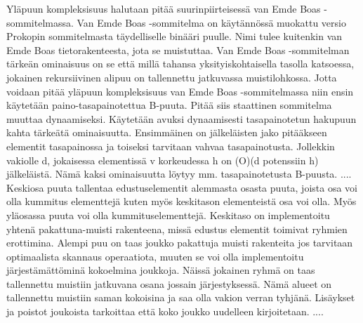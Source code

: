\documentclass[finnish]{tktltiki2}
\theoremstyle{definition}
\theoremstyle{remark}
\begin{document}
            Yläpuun kompleksisuus halutaan pitää suurinpiirteisessä van Emde Boas -sommitelmassa. Van Emde Boas -sommitelma on käytännössä muokattu versio Prokopin sommitelmasta täydelliselle binääri puulle. Nimi tulee kuitenkin van Emde Boas tietorakenteesta, jota se muistuttaa. Van Emde Boas -sommitelman tärkeän ominaisuus on se että millä tahansa yksityiskohtaisella tasolla katsoessa, jokainen rekursiivinen alipuu on tallennettu jatkuvassa muistilohkossa. Jotta voidaan pitää yläpuun kompleksisuus van Emde Boas -sommitelmassa niin ensin käytetään paino-tasapainotettua B-puuta. Pitää siis staattinen sommitelma muuttaa dynaamiseksi. Käytetään avuksi dynaamisesti tasapainotetun hakupuun kahta tärkeätä ominaisuutta. Ensimmäinen on jälkeläisten jako pitääkseen elementit tasapainossa ja toiseksi tarvitaan vahvaa tasapainotusta. Jollekkin vakiolle d, jokaisessa elementissä v korkeudessa h on (O)(d potenssiin h) jälkeläistä. Nämä kaksi ominaisuutta löytyy mm. tasapainotetusta B-puusta. ....
              Keskiosa puuta tallentaa edustuselementit alemmasta osasta puuta, joista osa voi olla kummitus elementtejä kuten myös keskitason elementeistä osa voi olla. Myös yläosassa puuta voi olla kummituselementtejä. Keskitaso on implementoitu yhtenä pakattuna-muisti rakenteena, missä edustus elementit toimivat ryhmien erottimina. Alempi puu on taas joukko pakattuja muisti rakenteita jos tarvitaan optimaalista skannaus operaatiota, muuten se voi olla implementoitu järjestämättöminä kokoelmina joukkoja. Näissä jokainen ryhmä on taas tallennettu muistiin jatkuvana osana jossain järjestyksessä. Nämä alueet on tallennettu muistiin saman kokoisina ja saa olla vakion verran tyhjänä. Lisäykset ja poistot joukoista tarkoittaa että koko joukko uudelleen kirjoitetaan. ....



%
%
% 
%



\end{document}
